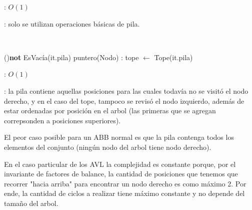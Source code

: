 \begin{Algoritmos}
	\complejidad: $O(1)$

	\justifcomp: solo se utilizan operaciones básicas de pila.

	~

	\begin{algorithm}[H]
		\NoCaptionOfAlgo
		\caption{}
		\While(){\textbf{not} EsVacía(it.pila)} {
			puntero(Nodo) : tope $\leftarrow$ Tope(it.pila)
		}
	\end{algorithm}

	\complejidad: $O(1)$

	\justifcomp: la pila contiene aquellas posiciones para las cuales todavía no se visitó el nodo derecho, y en el caso del tope, tampoco se revisó el nodo izquierdo, además de estar ordenadas por posición en el arbol (las primeras que se agregan correpsonden a posiciones superiores).

	El peor caso posible para un ABB normal es que la pila contenga todos los elementos del conjunto (ningún nodo del arbol tiene nodo derecho).

	En el caso particular de los AVL la complejidad es constante porque, por el invariante de factores de balance, la cantidad de posiciones que tenemos que recorrer "hacia arriba" para encontrar un nodo derecho es como máximo 2. Por ende, la cantidad de ciclos a realizar tiene máximo constante y no depende del tamaño del arbol.

\end{Algoritmos}